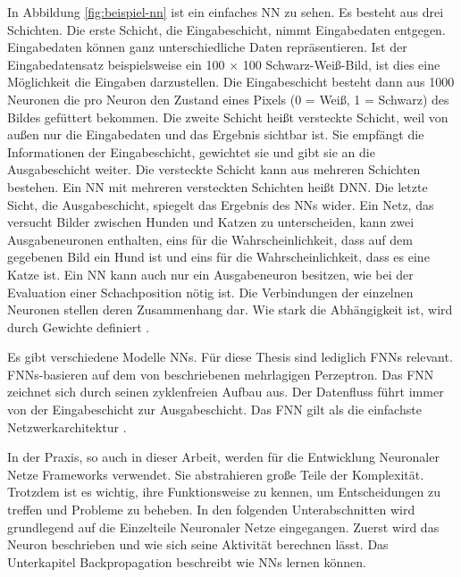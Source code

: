 In Abbildung \autoref{fig:beispiel-nn} ist ein einfaches \Acl{NN} zu sehen. Es besteht aus drei Schichten. Die erste Schicht, die Eingabeschicht, nimmt Eingabedaten entgegen. Eingabedaten können ganz unterschiedliche Daten repräsentieren. Ist der Eingabedatensatz beispielsweise ein 100 × 100 Schwarz-Weiß-Bild, ist dies eine Möglichkeit die Eingaben darzustellen. Die Eingabeschicht besteht dann aus 1000 Neuronen die pro Neuron den Zustand eines Pixels (0 = Weiß, 1 = Schwarz) des Bildes gefüttert bekommen. Die zweite Schicht heißt versteckte Schicht, weil von außen nur die Eingabedaten und das Ergebnis sichtbar ist. Sie empfängt die Informationen der Eingabeschicht, gewichtet sie und gibt sie an die Ausgabeschicht weiter. Die versteckte Schicht kann aus mehreren Schichten bestehen. Ein \ac{NN} mit mehreren versteckten Schichten heißt \ac{DNN}. Die letzte Sicht, die Ausgabeschicht, spiegelt das Ergebnis des \acp{NN} wider. Ein Netz, das versucht Bilder zwischen Hunden und Katzen zu unterscheiden, kann zwei Ausgabeneuronen enthalten, eins für die Wahrscheinlichkeit, dass auf dem gegebenen Bild ein Hund ist und eins für die Wahrscheinlichkeit, dass es eine Katze ist. Ein \ac{NN} kann auch nur ein Ausgabeneuron besitzen, wie \zb{} bei der Evaluation einer Schachposition nötig ist. Die Verbindungen der einzelnen Neuronen stellen deren Zusammenhang dar. Wie stark die Abhängigkeit ist, wird durch Gewichte definiert \cite[S. 2--7]{krawczak2013multilayer}.

Es gibt verschiedene Modelle \Aclp{NN}. Für diese Thesis sind lediglich \acp{FNN} relevant. \acp{FNN}-basieren auf dem von \citeauthor{rosenblatt1958perceptron} \cite{rosenblatt1958perceptron} beschriebenen mehrlagigen Perzeptron. Das \ac{FNN} zeichnet sich durch seinen zyklenfreien Aufbau aus. Der Datenfluss führt immer von der Eingabeschicht zur Ausgabeschicht. Das \ac{FNN} gilt als die einfachste Netzwerkarchitektur \cite{Schmidhuber2015}.

In der Praxis, so auch in dieser Arbeit, werden für die Entwicklung Neuronaler Netze Frameworks verwendet. Sie abstrahieren große Teile der Komplexität. Trotzdem ist es wichtig, ihre Funktionsweise zu kennen, um Entscheidungen zu treffen und Probleme zu beheben. In den folgenden Unterabschnitten wird grundlegend auf die Einzelteile Neuronaler Netze eingegangen. Zuerst wird das Neuron beschrieben und wie sich seine Aktivität berechnen lässt. Das Unterkapitel Backpropagation beschreibt wie \acp{NN} lernen können.

